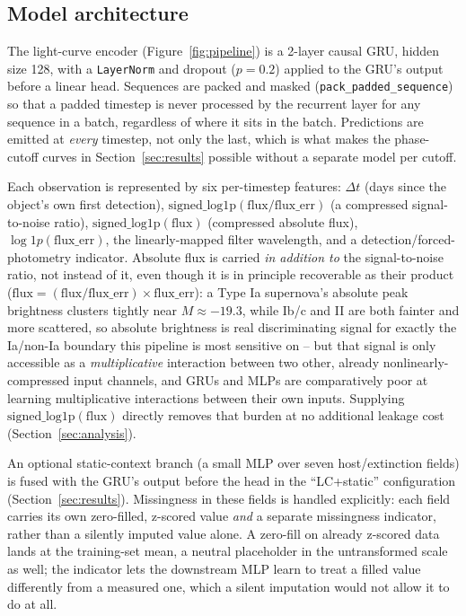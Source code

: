 \subsection{Model architecture}

The light-curve encoder (Figure~\ref{fig:pipeline}) is a 2-layer causal GRU,
hidden size 128, with a \texttt{LayerNorm} and dropout ($p=0.2$) applied to
the GRU's output before a linear head. Sequences are packed and masked
(\texttt{pack\_padded\_sequence}) so that a padded timestep is never
processed by the recurrent layer for any sequence in a batch, regardless of
where it sits in the batch. Predictions are emitted at \emph{every}
timestep, not only the last, which is what makes the phase-cutoff curves in
Section~\ref{sec:results} possible without a separate model per cutoff.

Each observation is represented by six per-timestep features:
$\Delta t$ (days since the object's own first detection),
$\mathrm{signed\_log1p}(\mathrm{flux}/\mathrm{flux\_err})$ (a compressed
signal-to-noise ratio), $\mathrm{signed\_log1p}(\mathrm{flux})$ (compressed
absolute flux), $\log1p(\mathrm{flux\_err})$, the linearly-mapped filter
wavelength, and a detection/forced-photometry indicator. Absolute flux is
carried \emph{in addition to} the signal-to-noise ratio, not instead of it,
even though it is in principle recoverable as their product
($\mathrm{flux} = (\mathrm{flux}/\mathrm{flux\_err}) \times
\mathrm{flux\_err}$): a Type Ia supernova's absolute peak brightness clusters
tightly near $M \approx -19.3$, while Ib/c and II are both fainter and more
scattered, so absolute brightness is real discriminating signal for exactly
the Ia/non-Ia boundary this pipeline is most sensitive on -- but that signal
is only accessible as a \emph{multiplicative} interaction between two other,
already nonlinearly-compressed input channels, and GRUs and MLPs are
comparatively poor at learning multiplicative interactions between their own
inputs. Supplying $\mathrm{signed\_log1p}(\mathrm{flux})$ directly removes
that burden at no additional leakage cost (Section~\ref{sec:analysis}).

An optional static-context branch (a small MLP over seven host/extinction
fields) is fused with the GRU's output before the head in the
``LC+static'' configuration (Section~\ref{sec:results}). Missingness in
these fields is handled explicitly: each field carries its own
zero-filled, z-scored value \emph{and} a separate missingness indicator,
rather than a silently imputed value alone. A zero-fill on already
z-scored data lands at the training-set mean, a neutral placeholder in the
untransformed scale as well; the indicator lets the downstream MLP learn to
treat a filled value differently from a measured one, which a silent
imputation would not allow it to do at all.

